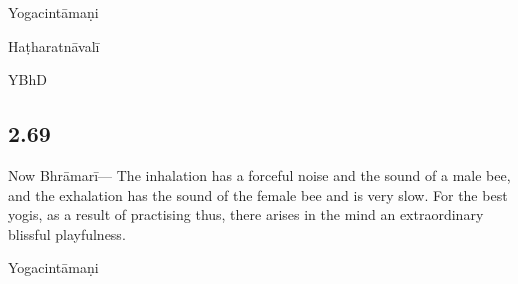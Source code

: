 \begin{ekdosis}
\begin{testimonia}[hp02_068]
Yogacintāmaṇi

\begin{versinnote}
\end{versinnote}

Haṭharatnāvalī

\begin{versinnote}
\end{versinnote}

YBhD

\begin{versinnote}
\end{versinnote}
\end{testimonia}

\begin{philcomm}[hp02_068]
\end{philcomm}

\subsection*{2.69}
\begin{translation}[hp02_069]
Now Bhrāmarī---
The inhalation has a forceful noise and the sound of a male bee, and the exhalation has the sound of the female bee and is very slow. For the best yogis, as a result of practising thus, there arises in the mind an extraordinary blissful playfulness.
\end{translation}

\begin{testimonia}[hp02_069]
Yogacintāmaṇi

\begin{versinnote}
\end{versinnote}


\end{testimonia}
\end{ekdosis}
